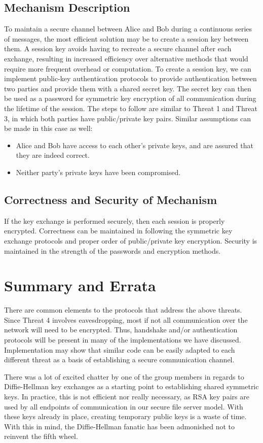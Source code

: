 \documentclass[11pt]{article}
\begin{document}
\subsection{Mechanism Description}
To maintain a secure channel between Alice and Bob during a continuous series of messages, the most efficient solution may be to create a session key between them. A session key avoids having to recreate a secure channel after each exchange, resulting in increased efficiency over alternative methods that would require more frequent overhead or computation. To create a session key, we can implement public-key authentication protocols to provide authentication between two parties and provide them with a shared secret key. The secret key can then be used as a password for symmetric key encryption of all communication during the lifetime of the session. The steps to follow are similar to Threat 1 and Threat 3, in which both parties have public/private key pairs. Similar assumptions can be made in this case as well:
\begin{itemize}
\item{}Alice and Bob have access to each other's private keys, and are assured that they are indeed correct.
\item{}Neither party's private keys have been compromised.
\end{itemize}
\subsection{Correctness and Security of Mechanism}
If the key exchange is performed securely, then each session is properly encrypted. Correctness can be maintained in following the symmetric key exchange protocols and proper order of public/private key encryption. Security is maintained in the strength of the passwords and encryption methods.
\section{Summary and Errata}
There are common elements to the protocols that address the above threats. Since Threat 4 involves eavesdropping, most if not all communication over the network will need to be encrypted. Thus, handshake and/or authentication protocols will be present in many of the implementations we have discussed. Implementation may show that similar code can be easily adapted to each different threat as a basis of establishing a secure communication channel.

There was a lot of excited chatter by one of the group members in regards to Diffie-Hellman key exchanges as a starting point to establishing shared symmetric keys. In practice, this is not efficient nor really necessary, as RSA key pairs are used by all endpoints of communication in our secure file server model. With these keys already in place, creating temporary public keys is a waste of time. With this in mind, the Diffie-Hellman fanatic has been admonished not to reinvent the fifth wheel.
\end{document}
